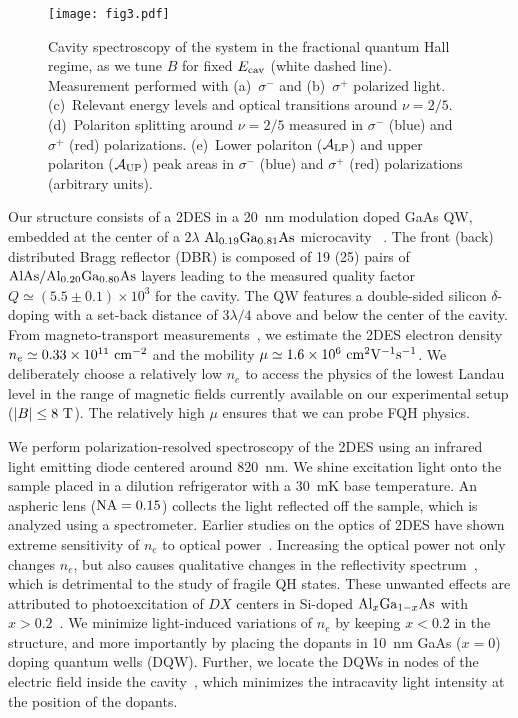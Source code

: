\documentclass[prl,twocolumn,10pt,showpacs,superscriptaddress,longbibliography,footnoteinbib]{revtex4-1}
\begin{document}
\begin{figure}
\centering
\texttt{[image: fig3.pdf]}
\caption{Cavity spectroscopy of the system in the fractional quantum Hall regime, as we tune $B$ for fixed $E_{\rm cav}$ (white dashed line). Measurement performed with (a)~$\sigma^-$ and (b)~$\sigma^+$ polarized light. (c)~Relevant energy levels and optical transitions around $\nu=2/5$. (d)~Polariton splitting around $\nu=2/5$ measured in $\sigma^-$ (blue) and $\sigma^+$ (red) polarizations. (e)~Lower polariton ($\mathcal{A}_{\rm LP}$) and upper polariton ($\mathcal{A}_{\rm UP}$) peak areas in $\sigma^-$ (blue) and $\sigma^+$ (red) polarizations (arbitrary units).}
\label{fig:FQHE}
\end{figure}

Our structure consists of a 2DES in a 20~nm modulation doped GaAs QW, embedded at the center of a $2 \lambda$ $\rm Al_{0.19}Ga_{0.81}As$ microcavity ~\cite{Supplemental}. The front (back) distributed Bragg reflector (DBR) is composed of 19 (25) pairs of $\rm AlAs / Al_{0.20}Ga_{0.80}As$ layers leading to the measured quality factor $Q \simeq (5.5 \pm 0.1) \times 10^3$ for the cavity. The QW features a double-sided silicon $\delta$-doping with a set-back distance of $3\lambda / 4$ above and below the center of the cavity. From magneto-transport measurements~\cite{Koon1992}, we estimate the 2DES electron density $n_e \simeq 0.33 \times 10^{11}~{\rm cm}^{-2}$ and the mobility $\mu \simeq 1.6 \times 10^6~{\rm cm}^2{\rm V}^{-1}{\rm s}^{-1}$. We deliberately choose a relatively low $n_e$ to access the physics of the lowest Landau level in the range of magnetic fields currently available on our experimental setup ($|B| \leq 8~{\rm T}$). The relatively high $\mu$ ensures that we can probe FQH physics.

We perform polarization-resolved spectroscopy of the 2DES using an infrared light emitting diode centered around 820~nm. We shine excitation light onto the sample placed in a dilution refrigerator with a 30~mK base temperature. An aspheric lens (${\rm NA}=0.15$) collects the light reflected off the sample, which is analyzed using a spectrometer. Earlier studies on the optics of 2DES have shown extreme sensitivity of $n_e$ to optical power~\cite{Kukushkin1989,Goldberg1992,Groshaus2007,Smolka2014}. Increasing the optical power not only changes $n_e$, but also causes qualitative changes in the reflectivity spectrum~\cite{Wuster2015}, which is detrimental to the study of fragile QH states. These unwanted effects are attributed to photoexcitation of $DX$ centers in Si-doped ${\rm Al}_x {\rm Ga}_{1-x} {\rm As}$ with $x > 0.2$~\cite{Ihn2010}. We minimize light-induced variations of $n_e$ by keeping $x < 0.2$ in the structure, and more importantly by placing the dopants in 10~nm GaAs ($x=0$) doping quantum wells (DQW). Further, we locate the DQWs in nodes of the electric field inside the cavity~\cite{Supplemental}, which minimizes the intracavity light intensity at the position of the dopants.
\end{document}
